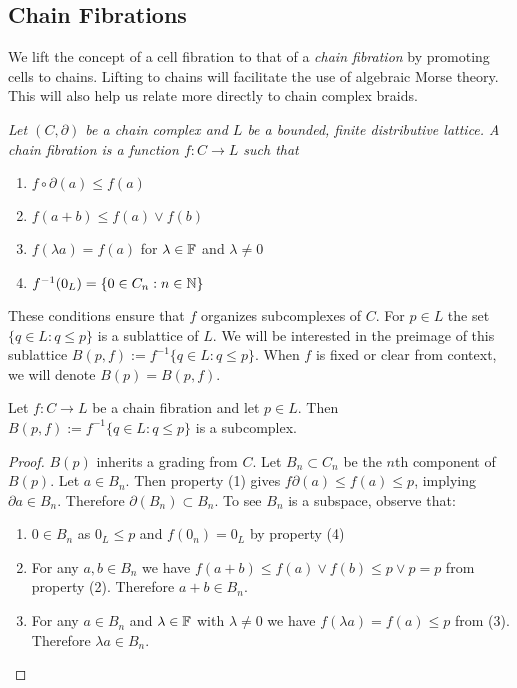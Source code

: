 \subsection{Chain Fibrations}

We lift the concept of a cell fibration to that of a {\em chain fibration} by promoting cells to chains.  Lifting to chains will facilitate the use of algebraic Morse theory.  This will also help us relate more directly to chain complex braids.



\begin{defn}\label{def:cf}
{\em
Let $(C,\partial)$ be a chain complex and $L$ be a bounded, finite distributive lattice.  A {\em chain fibration} is a function $f:C\to L$ such that
\begin{enumerate}
\item $f\circ \partial(a) \leq f(a)$

\item $f(a+ b) \leq f(a)\vee f(b)$

\item $f(\lambda a) = f(a)$ for $\lambda\in {\mathbb{F}}$ and $\lambda \neq 0$ 

\item $f^{-1}(0_L) = \{0 \in C_n: n\in {\mathbb{N}}\}$

\end{enumerate}
}
\end{defn}


These conditions ensure that $f$ organizes subcomplexes of $C$.  For $p\in L$ the set $\{q\in L:q\leq p\}$ is a sublattice of $L$.  We will be interested in the preimage of this sublattice $B(p,f):=f^{-1}\{q\in L: q\leq p\}$. When $f$ is fixed or clear from context, we will denote $B(p)=B(p,f)$.



\begin{prop}\label{prop:cfDown}
Let $f:C\to L$ be a chain fibration and let $p\in L$.  Then $B(p,f):=f^{-1}\{q\in L: q\leq p\}$ is a subcomplex.  
\end{prop}
\begin{proof}
$B(p)$ inherits a grading from $C$. Let $B_n\subset C_n$  be the $n$th component of $B(p)$.  Let $a\in B_n$.  Then property (1) gives $f\partial (a)\leq f(a)\leq p$, implying $\partial a\in B_n$.  Therefore $\partial(B_n)\subset B_n$.  To see $B_n$ is a subspace, observe that:
\begin{enumerate}
\item $0\in B_n$ as $0_L \leq p$ and $f(0_n)=0_L$ by property (4)
\item For any $a,b\in B_n$ we have $f(a+b)\leq f(a)\vee f(b)\leq p \vee p = p$ from property (2).  Therefore $a+b\in B_n$.
\item For any $a\in B_n$ and $\lambda\in {\mathbb{F}}$ with $\lambda\neq 0$ we have $f(\lambda a ) = f(a) \leq p$ from (3). Therefore $\lambda a \in B_n$.
\end{enumerate}
\end{proof}

